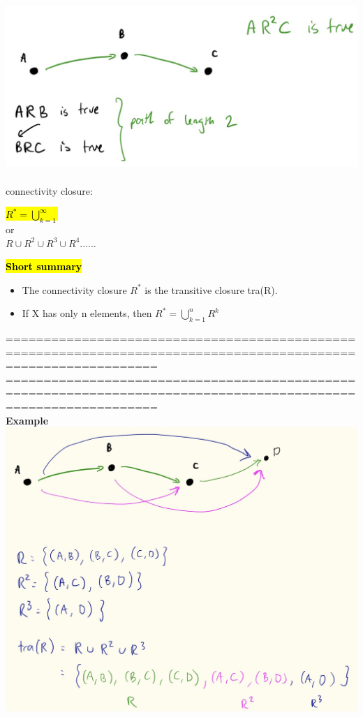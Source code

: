\documentclass{article}
\begin{document}
\begin{itemize}
\includegraphics[width=0.8\linewidth]{graph/17.jpg} \\%
\\
connectivity closure:
\begin{center}
\hl{$R^* = \bigcup_{k=1}^{\infty}$}\\
or \\
$R \cup R^2 \cup R^3 \cup R^4 ......$
\end{center}


\textbf{\hl{Short summary}}
\begin{itemize}
\item The connectivity closure $R^*$ is the transitive closure tra(R).
\item If X has only n elements,  then $R^* = \bigcup^n_{k=1} R^k$
\end{itemize}

================================================================================================================
\newpage
================================================================================================================\\

\textbf{Example}\\
\includegraphics[width=0.8\linewidth]{graph/18.jpg} \\%


\end{itemize}
\end{document}
